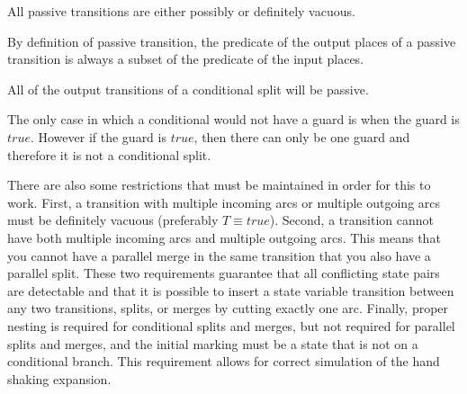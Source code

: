 \begin{lemma}
All passive transitions are either possibly or definitely vacuous.

By definition of passive transition, the predicate of the output places of a passive transition is always a subset of the predicate of the input places.
\end{lemma}

\begin{lemma}
All of the output transitions of a conditional split will be passive.

The only case in which a conditional would not have a guard is when the guard is $true$. However if the guard is $true$, then there can only be one guard and therefore it is not a conditional split.
\end{lemma}

There are also some restrictions that must be maintained in order for this to work. First, a transition with multiple incoming arcs or multiple outgoing arcs must be definitely vacuous (preferably $T \equiv true$). Second, a transition cannot have both multiple incoming arcs and multiple outgoing arcs. This means that you cannot have a parallel merge in the same transition that you also have a parallel split. These two requirements guarantee that all conflicting state pairs are detectable and that it is possible to insert a state variable transition between any two transitions, splits, or merges by cutting exactly one arc. Finally, proper nesting is required for conditional splits and merges, but not required for parallel splits and merges, and the initial marking must be a state that is not on a conditional branch. This requirement allows for correct simulation of the hand shaking expansion.



